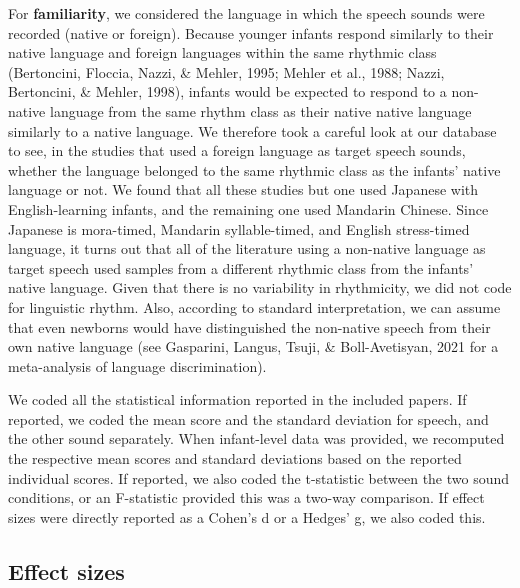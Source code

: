 \documentclass[
  man,mask,floatsintext]{apa6}
\begin{document}
For \textbf{familiarity}, we considered the language in which the speech sounds were recorded (native or foreign). Because younger infants respond similarly to their native language and foreign languages within the same rhythmic class (Bertoncini, Floccia, Nazzi, \& Mehler, 1995; Mehler et al., 1988; Nazzi, Bertoncini, \& Mehler, 1998), infants would be expected to respond to a non-native language from the same rhythm class as their native native language similarly to a native language. We therefore took a careful look at our database to see, in the studies that used a foreign language as target speech sounds, whether the language belonged to the same rhythmic class as the infants' native language or not. We found that all these studies but one used Japanese with English-learning infants, and the remaining one used Mandarin Chinese. Since Japanese is mora-timed, Mandarin syllable-timed, and English stress-timed language, it turns out that all of the literature using a non-native language as target speech used samples from a different rhythmic class from the infants' native language. Given that there is no variability in rhythmicity, we did not code for linguistic rhythm. Also, according to standard interpretation, we can assume that even newborns would have distinguished the non-native speech from their own native language (see Gasparini, Langus, Tsuji, \& Boll-Avetisyan, 2021 for a meta-analysis of language discrimination).

We coded all the statistical information reported in the included papers. If reported, we coded the mean score and the standard deviation for speech, and the other sound separately. When infant-level data was provided, we recomputed the respective mean scores and standard deviations based on the reported individual scores. If reported, we also coded the t-statistic between the two sound conditions, or an F-statistic provided this was a two-way comparison. If effect sizes were directly reported as a Cohen's d or a Hedges' g, we also coded this.

\hypertarget{effect-sizes}{%
\subsection{Effect sizes}\label{effect-sizes}}
\end{document}

